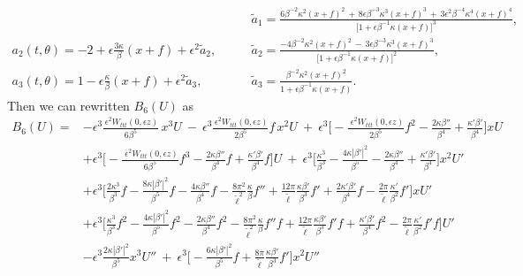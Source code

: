 \documentclass[10pt, reqno]{amsart}
\numberwithin{equation}{section}
\theoremstyle{definition}
\begin{document}
{{\begin{align}
\qquad
&{\tilde a}_1=\frac{6\beta^{-2}\kappa^2(x+f)^2 \,+\,8\epsilon\beta^{-3}\kappa^3(x+f)^3
\,+\,3\epsilon^2\beta^{-4}\kappa^4(x+f)^4}{\big[1+\epsilon\beta^{-1}\kappa(x+f)\big]^3},
\nonumber\\[2mm]
a_2(t, \theta) = -2 + \epsilon \frac{3\kappa}{\beta}(x+f) + \epsilon^2 {\tilde a}_2,
\qquad
&{\tilde a}_2=\frac{-4\beta^{-2}\kappa^2(x+f)^2 \,-\,3\epsilon\beta^{-3}\kappa^3(x+f)^3}{\big[1+\epsilon\beta^{-1}\kappa(x+f)\big]^2},
\nonumber\\[2mm]
a_3(t, \theta) = 1- \epsilon \frac{\kappa}{\beta}(x+f) + \epsilon^2 {\tilde a}_3,
\qquad
&{\tilde a}_3=\frac{\beta^{-2}\kappa^2(x+f)^2}{1+\epsilon\beta^{-1}\kappa(x+f)}.
\end{align}
Then we can rewritten $B_6(U)$ as
\begin{align*}
B_6(U)= & - \epsilon^3 \frac{\,\epsilon^2 W_{ttt}(0, \epsilon z)}{6\beta^5}\, x^3 U
\ -\
\epsilon^3\frac{\, \epsilon^2W_{ttt}(0, \epsilon z)}{2\beta^5}f\,x^2 U
\ +\ \epsilon^3\Big[- \frac{\, \, \epsilon^2W_{ttt}(0, \epsilon z)}{2\beta^5}f^2 - \frac{2\kappa\beta''}{\beta^4} +\frac{\kappa'\beta'} {\beta^4} \Big] x U
\nonumber\\[2mm]
& + \epsilon^3\Big[-\frac{\, \, \epsilon^2 W_{ttt}(0, \epsilon z)}{6\beta^5}f^3 -\frac{2\kappa\beta''}{\beta^4} f +\frac{\kappa'\beta'} {\beta^4} f\Big] U
\ +\ \epsilon^3\Big[ \frac{\kappa^3}{\beta^3}-\frac{4\kappa|\beta'|^2}{\beta^5} -\frac{2\kappa\beta''}{\beta^4} + \frac{\kappa'\beta'} {\beta^4} \Big]x^2U'
\nonumber\\[2mm]
 & + \epsilon^3\Big[
 \frac{2\kappa^3}{\beta^3}f
 -\frac{8\kappa|\beta'|^2}{\beta^5} f
 -\frac{4\kappa\beta''}{\beta^4}f
 -\frac{8\pi^2}{{\tilde\ell}^2}\frac{\kappa}{\beta} f''
+\frac{12\pi }{ {\tilde\ell}}\frac{\kappa\beta'}{\beta^3} f'
+\frac{2\kappa'\beta'}{\beta^4}f
- \frac{2\pi}{{\tilde\ell}} \frac{\kappa'}{\beta^2} f'\Big]xU'
\nonumber\\[2mm]
 & + \epsilon^3 \Big[
 \frac{\kappa^3}{\beta^3}f^2
 -\frac{4\kappa|\beta'|^2}{\beta^5} f^2
 - \frac{2\kappa\beta''}{\beta^4}f^2
 -\frac{8\pi^2}{{\tilde\ell}^2}\frac{\kappa}{\beta} f''f
 +\frac{12\pi }{ {\tilde\ell}}\frac{\kappa\beta'}{\beta^3} f' f
 + \frac{\kappa'\beta'} {\beta^4}f^2
 - \frac{2\pi}{{\tilde\ell}} \frac{\kappa'}{\beta^2} f'f\Big]U'
\nonumber\\[2mm]
 & -\epsilon^3 \frac{2\kappa|\beta'|^2}{\beta^5} x^3 U''
 \ +\
 \epsilon^3\Big[ -\frac{6\kappa|\beta'|^2}{\beta^5}f
 +\frac{8\pi}{ {\tilde\ell}}\frac{\kappa\beta'}{\beta^3} f'\Big] x^2 U''
\nonumber\\[2mm]

\end{align*}}}
\end{document}
